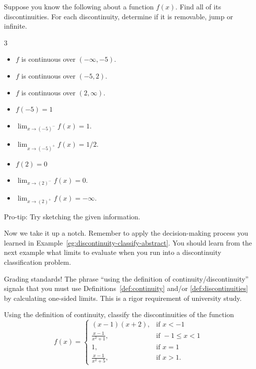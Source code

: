 \documentclass[../main.tex]{subfiles}
\begin{document}
\begin{example} \label{eg:discontinuity-classify-abstract}
  Suppose you know the following about a function \(f(x)\). Find all of its discontinuities. For each discontinuity, determine if it is removable, jump or infinite.

  \begin{multicols}{3}
    \begin{itemize}
      \item \(f\) is continuous over \((-\infty, -5)\).
      \item \(f\) is continuous over \((-5, 2)\).
      \item \(f\) is continuous over \((2, \infty)\).
        \columnbreak
      \item \(f(-5) = 1\)
      \item \(\lim_{x \to (-5)^{-}} f(x) = 1\).
      \item \(\lim_{x \to (-5)^{+}} f(x) = 1/2\).
        \columnbreak
      \item \(f(2) = 0\)
      \item \(\lim_{x \to (2)^{-}} f(x) = 0\).
      \item \(\lim_{x \to (2)^{+}} f(x) = -\infty\).
    \end{itemize}
  \end{multicols}

  {\footnotesize Pro-tip: Try sketching the given information.}

  \blanks*
\end{example}
\clearpage

Now we take it up a notch. Remember to apply the decision-making process you learned in Example~\ref{eg:discontinuity-classify-abstract}. You should learn from the next example what limits to evaluate when you run into a discontinuity classification problem.

\faExclamationTriangle{} Grading standards! The phrase \enquote{using the definition of continuity/discontinuity} signals that you must use Definitions~\ref{def:continuity} and/or \ref{def:discontinuities} by calculating one-sided limits. This is a rigor requirement of university study.

\begin{example}
  Using the definition of continuity, classify the discontinuities of the function
  \[
    f(x) =
    \begin{cases}
      (x-1)(x+2),          & \text{if } x < -1 \\[1ex]
      \frac{x-1}{x^{2}+1}, & \text{if } -1 \le x < 1 \\[1ex]
      1,                   & \text{if } x = 1 \\[1ex]
      \frac{x-1}{x^{2}+5}, & \text{if } x > 1.
    \end{cases}
  \]

  \blanks*
\end{example}
\clearpage
\end{document}
